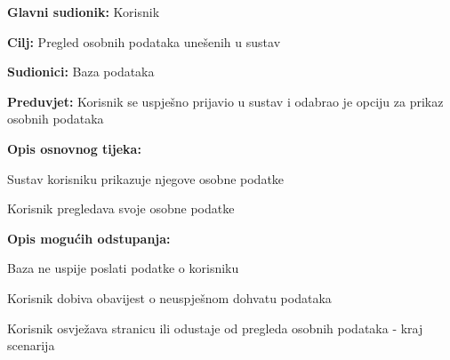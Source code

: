 					\noindent {}
					\begin{packed_item}
	
						\item \textbf{Glavni sudionik: }Korisnik
						\item  \textbf{Cilj:} Pregled osobnih podataka unešenih u sustav
						\item  \textbf{Sudionici:} Baza podataka
						\item  \textbf{Preduvjet:} Korisnik se uspješno prijavio u sustav i odabrao je opciju za prikaz osobnih podataka
						\item  \textbf{Opis osnovnog tijeka:}
						
						\item[] \begin{packed_enum}
							\item Sustav korisniku prikazuje njegove osobne podatke 
							\item Korisnik pregledava svoje osobne podatke
						\end{packed_enum}
						\eject
						\item  \textbf{Opis mogućih odstupanja:}

						\item[] \begin{packed_item}
							\item[1.a] Baza ne uspije poslati podatke o korisniku
							\item[] \begin{packed_enum}
								
								\item Korisnik dobiva obavijest o neuspješnom dohvatu podataka
								\item Korisnik osvježava stranicu ili odustaje od pregleda osobnih podataka - kraj scenarija
							
							\end{packed_enum}	
						\end{packed_item}	
					\end{packed_item}

